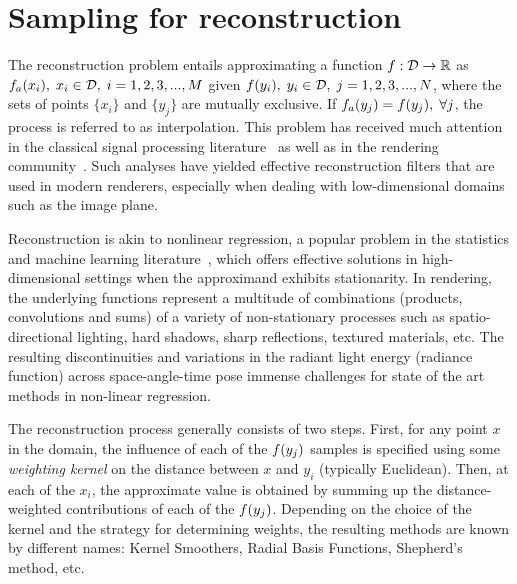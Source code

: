 \documentclass[11pt,fleqn]{book} %
\begin{document}
\chapter{Sampling for reconstruction}
The reconstruction problem entails approximating a function $f:\mathcal{D}\rightarrow\mathbb{R}$ as ${f}_a(x_i), \; x_i\in\mathcal{D}, \;i=1,2,3,...,M$ given $f(y_i), \; y_i \in \mathcal{D}, \;j=1,2,3,...,N$, where the sets of points $\{x_i\}$ and $\{y_j\}$ are mutually exclusive. If ${f}_a(y_j) = f(y_j),\;\forall j$, the process is referred to as interpolation. This problem has received much attention in the classical signal processing literature~\cite{Nyquist,Shannon} as well as in the rendering community~\cite{DippeWold,Cook,Mitchell}. Such analyses have yielded effective reconstruction filters that are used in modern renderers, especially when dealing with low-dimensional domains such as the image plane.

Reconstruction is akin to nonlinear regression, a popular problem in the statistics and machine learning literature~\cite{MLTextBook}, which offers effective solutions in high-dimensional settings when the approximand exhibits stationarity. In rendering, the underlying functions represent a multitude of combinations (products, convolutions and sums) of a variety of non-stationary processes such as spatio-directional lighting, hard shadows, sharp reflections, textured materials, etc. The resulting discontinuities and variations in the radiant light energy (radiance function) across space-angle-time pose immense challenges for state of the art methods in non-linear regression.

The reconstruction process generally consists of two steps. First, for any point $x$ in the domain, the influence of each of the $f(y_j)$ samples is specified using some \textit{weighting kernel} on the distance between $x$ and $y_i$ (typically Euclidean). Then, at each of the $x_i$, the approximate value is obtained by summing up the distance-weighted contributions of each of the $f(y_j)$. Depending on the choice of the kernel and the strategy for determining weights, the resulting methods are known by different names: Kernel Smoothers, Radial Basis Functions, Shepherd's method, etc.  
\end{document}
